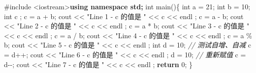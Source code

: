 \documentclass[
]{article}
\newenvironment{Shaded}{}{}
\newcommand{\CommentTok}[1]{\textcolor[rgb]{0.38,0.63,0.69}{\textit{#1}}}
\newcommand{\ControlFlowTok}[1]{\textcolor[rgb]{0.00,0.44,0.13}{\textbf{#1}}}
\newcommand{\DataTypeTok}[1]{\textcolor[rgb]{0.56,0.13,0.00}{#1}}
\newcommand{\DecValTok}[1]{\textcolor[rgb]{0.25,0.63,0.44}{#1}}
\newcommand{\ErrorTok}[1]{\textcolor[rgb]{1.00,0.00,0.00}{\textbf{#1}}}
\newcommand{\ImportTok}[1]{#1}
\newcommand{\NormalTok}[1]{#1}
\newcommand{\OperatorTok}[1]{\textcolor[rgb]{0.40,0.40,0.40}{#1}}
\newcommand{\PreprocessorTok}[1]{\textcolor[rgb]{0.74,0.48,0.00}{#1}}
\newcommand{\StringTok}[1]{\textcolor[rgb]{0.25,0.44,0.63}{#1}}
\begin{document}
\begin{Shaded}
\begin{Highlighting}[]
\PreprocessorTok{\#include }\ImportTok{\textless{}iostream\textgreater{}}\ErrorTok{using namespace std; }
\DataTypeTok{int}\NormalTok{ main}\OperatorTok{()\{}
   \DataTypeTok{int}\NormalTok{ a }\OperatorTok{=} \DecValTok{21}\OperatorTok{;}   \DataTypeTok{int}\NormalTok{ b }\OperatorTok{=} \DecValTok{10}\OperatorTok{;}   \DataTypeTok{int}\NormalTok{ c }\OperatorTok{;} 
\NormalTok{   c }\OperatorTok{=}\NormalTok{ a }\OperatorTok{+}\NormalTok{ b}\OperatorTok{;}\NormalTok{   cout }\OperatorTok{\textless{}\textless{}} \StringTok{"Line 1 {-} c 的值是 "} \OperatorTok{\textless{}\textless{}}\NormalTok{ c }\OperatorTok{\textless{}\textless{}}\NormalTok{ endl }\OperatorTok{;}
\NormalTok{   c }\OperatorTok{=}\NormalTok{ a }\OperatorTok{{-}}\NormalTok{ b}\OperatorTok{;}\NormalTok{   cout }\OperatorTok{\textless{}\textless{}} \StringTok{"Line 2 {-} c 的值是 "} \OperatorTok{\textless{}\textless{}}\NormalTok{ c }\OperatorTok{\textless{}\textless{}}\NormalTok{ endl }\OperatorTok{;}
\NormalTok{   c }\OperatorTok{=}\NormalTok{ a }\OperatorTok{*}\NormalTok{ b}\OperatorTok{;}\NormalTok{   cout }\OperatorTok{\textless{}\textless{}} \StringTok{"Line 3 {-} c 的值是 "} \OperatorTok{\textless{}\textless{}}\NormalTok{ c }\OperatorTok{\textless{}\textless{}}\NormalTok{ endl }\OperatorTok{;}
\NormalTok{   c }\OperatorTok{=}\NormalTok{ a }\OperatorTok{/}\NormalTok{ b}\OperatorTok{;}\NormalTok{   cout }\OperatorTok{\textless{}\textless{}} \StringTok{"Line 4 {-} c 的值是 "} \OperatorTok{\textless{}\textless{}}\NormalTok{ c }\OperatorTok{\textless{}\textless{}}\NormalTok{ endl }\OperatorTok{;}
\NormalTok{   c }\OperatorTok{=}\NormalTok{ a }\OperatorTok{\%}\NormalTok{ b}\OperatorTok{;}\NormalTok{   cout }\OperatorTok{\textless{}\textless{}} \StringTok{"Line 5 {-} c 的值是 "} \OperatorTok{\textless{}\textless{}}\NormalTok{ c }\OperatorTok{\textless{}\textless{}}\NormalTok{ endl }\OperatorTok{;} 
   \DataTypeTok{int}\NormalTok{ d }\OperatorTok{=} \DecValTok{10}\OperatorTok{;}   \CommentTok{//  测试自增、自减}
\NormalTok{   c }\OperatorTok{=}\NormalTok{ d}\OperatorTok{++;}\NormalTok{   cout }\OperatorTok{\textless{}\textless{}} \StringTok{"Line 6 {-} c 的值是 "} \OperatorTok{\textless{}\textless{}}\NormalTok{ c }\OperatorTok{\textless{}\textless{}}\NormalTok{ endl }\OperatorTok{;} 
\NormalTok{   d }\OperatorTok{=} \DecValTok{10}\OperatorTok{;}    \CommentTok{// 重新赋值}
\NormalTok{   c }\OperatorTok{=}\NormalTok{ d}\OperatorTok{{-}{-};}\NormalTok{   cout }\OperatorTok{\textless{}\textless{}} \StringTok{"Line 7 {-} c 的值是 "} \OperatorTok{\textless{}\textless{}}\NormalTok{ c }\OperatorTok{\textless{}\textless{}}\NormalTok{ endl }\OperatorTok{;}   \ControlFlowTok{return} \DecValTok{0}\OperatorTok{;}
\OperatorTok{\}}
\end{Highlighting}
\end{Shaded}
\end{document}
